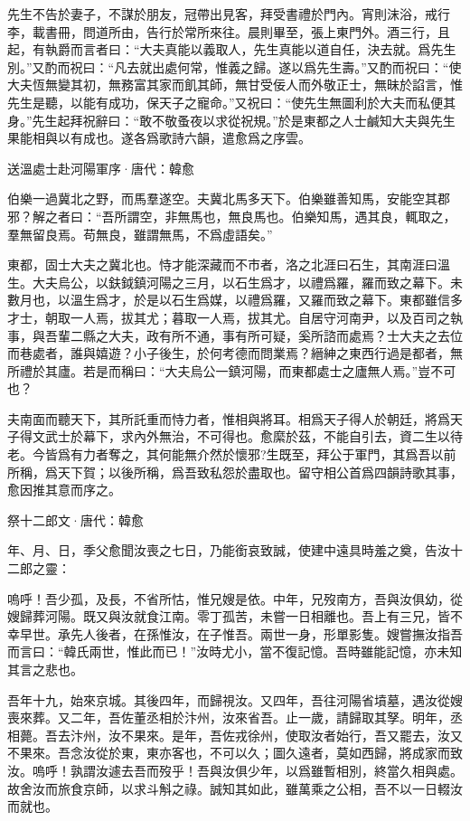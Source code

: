 \documentclass[12pt,a4paper]{ctexbook}
\begin{document}
先生不告於妻子，不謀於朋友，冠帶出見客，拜受書禮於門內。宵則沫浴，戒行李，載書冊，問道所由，告行於常所來往。晨則畢至，張上東門外。酒三行，且起，有執爵而言者曰：“大夫真能以義取人，先生真能以道自任，決去就。爲先生別。”又酌而祝曰：“凡去就出處何常，惟義之歸。遂以爲先生壽。”又酌而祝曰：“使大夫恆無變其初，無務富其家而飢其師，無甘受佞人而外敬正士，無昧於諂言，惟先生是聽，以能有成功，保天子之寵命。”又祝曰：“使先生無圖利於大夫而私便其身。”先生起拜祝辭曰：“敢不敬蚤夜以求從祝規。”於是東都之人士鹹知大夫與先生果能相與以有成也。遂各爲歌詩六韻，遣愈爲之序雲。\par
送溫處士赴河陽軍序·唐代：韓愈 \par
伯樂一過冀北之野，而馬羣遂空。夫冀北馬多天下。伯樂雖善知馬，安能空其郡邪？解之者曰：“吾所謂空，非無馬也，無良馬也。伯樂知馬，遇其良，輒取之，羣無留良焉。苟無良，雖謂無馬，不爲虛語矣。”\par
東都，固士大夫之冀北也。恃才能深藏而不市者，洛之北涯曰石生，其南涯曰溫生。大夫烏公，以鈇鉞鎮河陽之三月，以石生爲才，以禮爲羅，羅而致之幕下。未數月也，以溫生爲才，於是以石生爲媒，以禮爲羅，又羅而致之幕下。東都雖信多才士，朝取一人焉，拔其尤；暮取一人焉，拔其尤。自居守河南尹，以及百司之執事，與吾輩二縣之大夫，政有所不通，事有所可疑，奚所諮而處焉？士大夫之去位而巷處者，誰與嬉遊？小子後生，於何考德而問業焉？縉紳之東西行過是都者，無所禮於其廬。若是而稱曰：“大夫烏公一鎮河陽，而東都處士之廬無人焉。”豈不可也？\par
夫南面而聽天下，其所託重而恃力者，惟相與將耳。相爲天子得人於朝廷，將爲天子得文武士於幕下，求內外無治，不可得也。愈縻於茲，不能自引去，資二生以待老。今皆爲有力者奪之，其何能無介然於懷邪?生既至，拜公于軍門，其爲吾以前所稱，爲天下賀；以後所稱，爲吾致私怨於盡取也。留守相公首爲四韻詩歌其事，愈因推其意而序之。\par
祭十二郎文·唐代：韓愈 \par
年、月、日，季父愈聞汝喪之七日，乃能銜哀致誠，使建中遠具時羞之奠，告汝十二郎之靈：\par
嗚呼！吾少孤，及長，不省所怙，惟兄嫂是依。中年，兄歿南方，吾與汝俱幼，從嫂歸葬河陽。既又與汝就食江南。零丁孤苦，未嘗一日相離也。吾上有三兄，皆不幸早世。承先人後者，在孫惟汝，在子惟吾。兩世一身，形單影隻。嫂嘗撫汝指吾而言曰：“韓氏兩世，惟此而已！”汝時尤小，當不復記憶。吾時雖能記憶，亦未知其言之悲也。\par
吾年十九，始來京城。其後四年，而歸視汝。又四年，吾往河陽省墳墓，遇汝從嫂喪來葬。又二年，吾佐董丞相於汴州，汝來省吾。止一歲，請歸取其孥。明年，丞相薨。吾去汴州，汝不果來。是年，吾佐戎徐州，使取汝者始行，吾又罷去，汝又不果來。吾念汝從於東，東亦客也，不可以久；圖久遠者，莫如西歸，將成家而致汝。嗚呼！孰謂汝遽去吾而歿乎！吾與汝俱少年，以爲雖暫相別，終當久相與處。故舍汝而旅食京師，以求斗斛之祿。誠知其如此，雖萬乘之公相，吾不以一日輟汝而就也。\par
\end{document}
